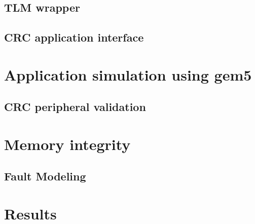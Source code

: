 \subsection{TLM wrapper}


\subsection{CRC application interface}



\section{Application simulation using gem5}


\subsection{CRC peripheral validation} 


\section{Memory integrity}


\subsection{Fault Modeling}


\section{Results}


